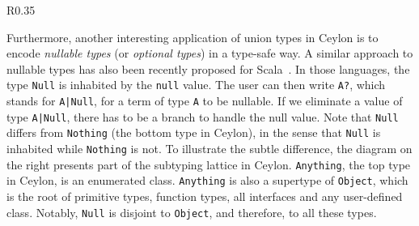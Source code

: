 \begin{wrapfigure}{R}{0.35\textwidth}
\begin{center}
\end{center}
\end{wrapfigure}
Furthermore, another interesting application of union types in Ceylon is to
encode \textit{nullable types} (or \textit{optional types}) in a type-safe way.
A similar approach to nullable types has also been recently proposed for
Scala~\citep{nieto20nulls}. In those languages, the type \lstinline{Null} is
inhabited by the \lstinline{null} value. The user can then write \lstinline{A?},
which stands for \lstinline{A|Null}, for a term of type \lstinline{A} to be
nullable. If we eliminate a value of type \lstinline{A|Null}, there has to be a
branch to handle the null value. Note that \lstinline{Null} differs from
\lstinline{Nothing} (the bottom type in Ceylon), in the sense that
\lstinline{Null} is inhabited while \lstinline{Nothing} is not. To illustrate
the subtle difference, the diagram on the right presents part of the subtyping
lattice in Ceylon. \lstinline{Anything}, the top type in Ceylon, is an
enumerated class. \lstinline{Anything} is also a supertype of
\lstinline{Object}, which is the root of primitive types, function types, all
interfaces and any user-defined class. Notably, \lstinline{Null} is disjoint to
\lstinline{Object}, and therefore, to all these types.




